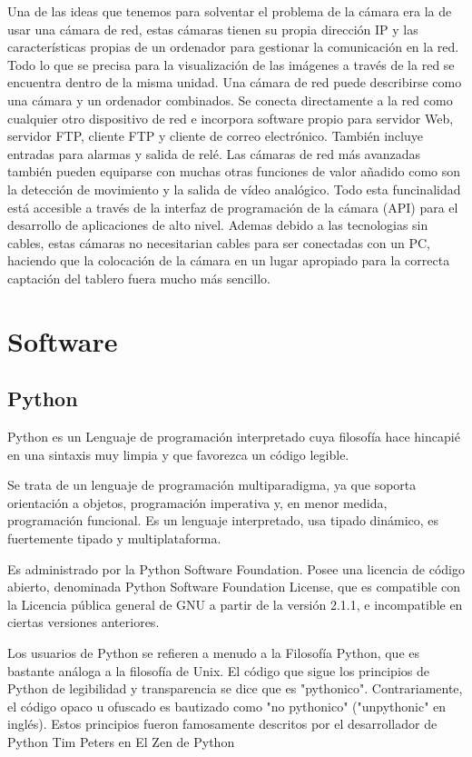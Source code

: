 \documentclass[12pt,a4papert,woside,openright,titlepage,final]{book}
\begin{document}
Una de las ideas que tenemos para solventar el problema de la cámara era la de
usar una cámara de red, estas cámaras tienen su propia dirección IP y las
características
propias de un ordenador para gestionar la comunicación en la red.
Todo lo que se precisa para la visualización de las imágenes a través
de la red se encuentra dentro de la misma unidad.
Una cámara de red puede describirse como una cámara y un
ordenador combinados. Se conecta directamente a la red como
cualquier otro dispositivo de red e incorpora software propio para
servidor Web, servidor FTP, cliente FTP y cliente de correo electrónico.
También incluye entradas para alarmas y salida de relé.
Las cámaras de red más avanzadas también pueden equiparse con
muchas otras funciones de valor añadido como son la detección de
movimiento y la salida de vídeo analógico.
Todo esta funcinalidad está accesible a través de la interfaz de
programación de la cámara (API) para el desarrollo de aplicaciones de
alto nivel.
Ademas debido a las tecnologias sin cables, estas cámaras no necesitarian cables
para ser conectadas con un PC, haciendo que la colocación de la cámara en un
lugar apropiado para la correcta captación del tablero fuera mucho más sencillo.

\chapter{Software}

\section{Python}

Python es un Lenguaje de programación interpretado cuya filosofía hace hincapié
en una sintaxis muy limpia y que favorezca un código legible.

Se trata de un lenguaje de programación multiparadigma, ya que soporta
orientación a objetos, programación imperativa y, en menor medida, programación
funcional. Es un lenguaje interpretado, usa tipado dinámico, es fuertemente
tipado y multiplataforma.

Es administrado por la Python Software Foundation. Posee una licencia de código
abierto, denominada Python Software Foundation License, que es compatible con
la Licencia pública general de GNU a partir de la versión 2.1.1, e incompatible
en ciertas versiones anteriores.

Los usuarios de Python se refieren a menudo a la Filosofía Python, que es
bastante análoga a la filosofía de Unix. El código que sigue los principios de
Python de legibilidad y transparencia se dice que es "pythonico".
Contrariamente, el código opaco u ofuscado es bautizado como "no pythonico"
("unpythonic" en inglés). Estos principios fueron famosamente descritos por el
desarrollador de Python Tim Peters en El Zen de Python
\end{document}
